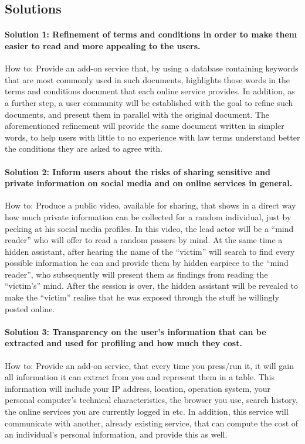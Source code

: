 \subsection{Solutions} 

\paragraph{Solution 1: Refinement of terms and conditions in order to make them 
easier to read and more appealing to the users.} 
How to: Provide an add-on service that, by using a database containing keywords 
that are most commonly used in such documents, highlights those words in the 
terms and conditions document that each online service provides. In addition, as 
a further step, a user community will be established with the goal to refine 
such documents, and present them in parallel with the original document. The 
aforementioned refinement will provide the same document written in simpler 
words, to help users with little to no experience with law terms understand 
better the conditions they are asked to agree with.

\paragraph{Solution 2: Inform users about the risks of sharing sensitive and 
private information on social media and on online services in general.} 
How to: Produce a public video, available for sharing, that shows in a direct 
way how much private information can be collected for a random individual, just 
by peeking at his social media profiles. In this video, the lead actor will be a 
``mind reader'' who will offer to read a random passers by mind. At the same 
time a hidden assistant, after hearing the name of the ``victim'' will search to 
find every possible information he can and provide them by hidden earpiece to 
the ``mind reader'', who subsequently will present them as findings from reading 
the ``victim's'' mind. After the session is over, the hidden assistant will be 
revealed to make the ``victim'' realise that he was exposed through the stuff he 
willingly posted online.

\paragraph{Solution 3: Transparency on the user's information that can be 
extracted and used for profiling and how much they cost.} 
How to: Provide an add-on service, that every time you press/run it, it will gain 
all information it can extract from you and represent them in a table. This 
information will include your IP address, location, operation system, your 
personal computer's technical characteristics, the browser you use, search 
history, the online services you are currently logged in etc. In addition, this 
service will communicate with another, already existing service, that can 
compute the cost of an individual's personal information, and provide this as 
well.

